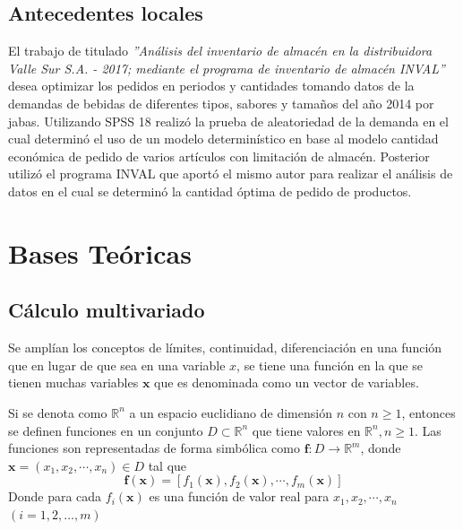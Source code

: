 \subsection{Antecedentes locales}

El trabajo de \cite{koper2017analisis} titulado \textsl{''Análisis del inventario de almacén en la distribuidora Valle Sur S.A. - 2017; mediante el programa de inventario de almacén INVAL''} desea optimizar los pedidos en periodos y cantidades tomando datos de la demandas de bebidas de diferentes tipos, sabores y tamaños del año 2014 por jabas. Utilizando SPSS 18 realizó la prueba de aleatoriedad de la demanda en el cual determinó el uso de un modelo determinístico en base al modelo cantidad económica de pedido de varios artículos con limitación de almacén. Posterior utilizó el programa INVAL que aportó el mismo autor para realizar el análisis de datos en el cual se determinó la cantidad óptima de pedido de productos.

\section{Bases Teóricas}

\subsection{Cálculo multivariado}
Se amplían los conceptos de límites, continuidad, diferenciación en una función que en lugar de que sea en una variable $x$, se tiene una función en la que se tienen muchas variables $\mathbf{x}$ que es denominada como un vector de variables. \citep{Khuri_2002}

Si se denota como $\mathbb{R}^n$ a un espacio euclidiano de dimensión $n$ con $n \geq 1$, entonces se definen funciones en un conjunto $D \subset \mathbb{R}^n$ que tiene valores en $\mathbb{R}^n, n \geq 1$. Las funciones son representadas de forma simbólica como $\mathbf{f}: D \rightarrow \mathbb{R}^m$, donde $\mathbf{x} = ({x}_{1},{x}_{2}, \cdots , {x}_{n}) \in D$ tal que
$$
\mathbf{f(x)}=[ {f}_{1}(\mathbf{x}), {f}_{2}(\mathbf{x}), \cdots , {f}_{m}(\mathbf{x}) ]
$$
Donde para cada ${f}_{i}(\mathbf{x})$ es una función de valor real para ${x}_{1}, {x}_{2}, \cdots, {x}_{n}$ $(i=1,2,\dots, m)$

\newpage
